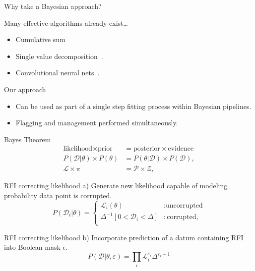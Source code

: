 \documentclass{beamer}
\begin{document}
\begin{frame}{Why take a Bayesian approach?}
  \begin{block}{Many effective algorithms already exist\dots}
    \begin{itemize}
    \item Cumulative sum~\cite{baan2004radio}
    \item Single value decomposition~\cite{offringa2012morphological}.
    \item Convolutional neural nets~\cite{sun2022robust}.
    \end{itemize}
  \end{block}
  \begin{block}{Our approach}
    \begin{itemize}
    \item Can be used as part of a single step fitting process within Bayesian pipelines.
    \item Flagging and management performed simultaneously. 
    \end{itemize}
  \end{block}
\end{frame}

\begin{frame}{Bayes Theorem}
  \begin{align}
    \text{likelihood} \times \text{prior} &= \text{posterior} \times \text{evidence} \\
    P(\mathcal{D}|\theta) \times P(\theta) &= P(\theta|\mathcal{D}) \times P(\mathcal{D}), \\
    \mathcal{L} \times \pi &= \mathcal{P} \times \mathcal{Z},
\end{align}  
\end{frame}

\begin{frame}{RFI correcting likelihood}
a) Generate new likelihood capable of modeling probability data point is corrupted.
    \begin{equation}
    P(\mathcal{D}_i|\theta) = \begin{cases}
        \mathcal{L}_i(\theta) &: \text{uncorrupted}\\
        \Delta^{-1}[ 0<\mathcal{D}_i<\Delta] &: \text{corrupted},\\
    \end{cases}
\end{equation}
\end{frame}

\begin{frame}{RFI correcting likelihood}
b) Incorporate prediction of a datum containing RFI into Boolean mask $\epsilon$.
\begin{equation}
    P(\mathcal{D}|\theta, \varepsilon) = \prod_{i} \mathcal{L}_{i}^{\varepsilon_{i}} \Delta^{\varepsilon_i-1}
    \label{eq:li2}
\end{equation}
\end{frame}
\end{document}
